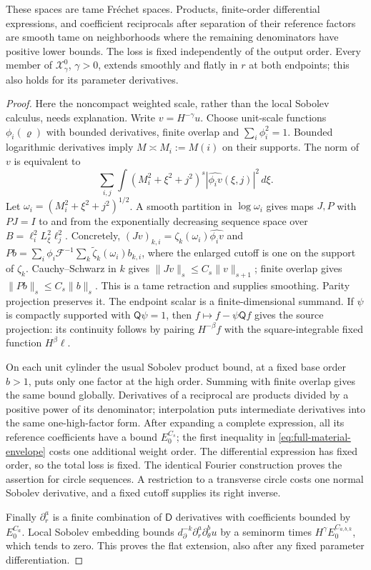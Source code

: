 \begin{lemma}
\label{prop:full-physical-tame}
These spaces are tame Fr\'echet spaces. Products, finite-order
differential expressions, and coefficient reciprocals after separation
of their reference factors are smooth tame on neighborhoods where the
remaining denominators have positive lower bounds. The loss is fixed
independently of the output order. Every member of
$\mathcal X^0_\gamma$, $\gamma>0$, extends smoothly and flatly in $r$
at both endpoints; this also holds for its parameter derivatives.
\end{lemma}

\begin{proof}
Here the noncompact weighted scale, rather than the local Sobolev
calculus, needs explanation. Write $v=H^{-\gamma}u$. Choose unit-scale
functions $\phi_i(\varrho)$ with bounded derivatives, finite overlap
and $\sum_i\phi_i^2=1$. Bounded logarithmic derivatives imply
$M\asymp M_i:=M(i)$ on their supports. The norm of $v$ is equivalent to
\[
 \sum_{i,j}\int (M_i^2+\xi^2+j^2)^s
                    |\widehat{\phi_i v}(\xi,j)|^2\,d\xi.
\]
Let $\omega_i=(M_i^2+\xi^2+j^2)^{1/2}$. A smooth partition in
$\log\omega_i$ gives maps $J,P$ with $PJ=I$ to and from the
exponentially decreasing sequence space over
$B=\ell_i^2L_\xi^2\ell_j^2$. Concretely,
$(Jv)_{k,i}=\zeta_k(\omega_i)\widehat{\phi_i v}$ and
$Pb=\sum_i\phi_i\mathcal F^{-1}\sum_k\widetilde\zeta_k(\omega_i)b_{k,i}$,
where the enlarged cutoff is one on the support of $\zeta_k$.
Cauchy--Schwarz in $k$ gives
$\|Jv\|_{s}\le C_s\|v\|_{s+1}$; finite overlap gives
$\|Pb\|_s\le C_s\|b\|_s$. This is a tame retraction and supplies
smoothing. Parity projection preserves it. The endpoint scalar is a
finite-dimensional summand. If $\psi$ is compactly supported with
$\mathsf Q\psi=1$, then $f\mapsto f-\psi\mathsf Qf$ gives the source
projection: its continuity follows by pairing $H^{-\beta}f$ with the
square-integrable fixed function $H^\beta\ell$.

On each unit cylinder the usual Sobolev product bound, at a fixed
base order $b>1$, puts only one factor at the high order. Summing with
finite overlap gives the same bound globally. Derivatives of a
reciprocal are products divided by a positive power of its denominator;
interpolation puts intermediate derivatives into the same one-high-factor
form. After expanding a complete expression, all its reference
coefficients have a bound $E_0^{C_s}$; the first inequality in
\eqref{eq:full-material-envelope} costs one additional weight order.
The differential expression has fixed order, so the total loss is fixed.
The identical Fourier construction proves the assertion for circle
sequences. A restriction to a transverse circle costs one normal
Sobolev derivative, and a fixed cutoff supplies its right inverse.

Finally $\partial_r^a$ is a finite combination of $\mathsf D$ derivatives
with coefficients bounded by $E_0^{C_a}$. Local Sobolev embedding bounds
$d_\partial^{-k}\partial_r^a\partial_\theta^b u$ by a seminorm times
$H^\gamma E_0^{C_{a,b,k}}$, which tends to zero. This proves the flat
extension, also after any fixed parameter differentiation.
\end{proof}

